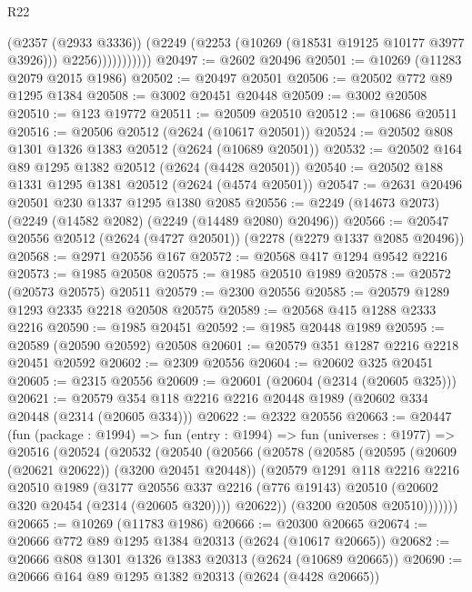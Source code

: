 \begin{lexlean}{R22}
\begin{coremodule}
                        (@2357 (@2933 @3336))
                        (@2249 (@2253 (@10269 (@18531 @19125 @10177 @3977 @3926))) @2256)))))))))))
@20497 := @2602 @20496
@20501 := @10269 (@11283 @2079 @2015 @1986)
@20502 := @20497 @20501
@20506 := @20502 @772 @89 @1295 @1384
@20508 := @3002 @20451 @20448
@20509 := @3002 @20508
@20510 := @123 @19772
@20511 := @20509 @20510
@20512 := @10686 @20511
@20516 := @20506 @20512 (@2624 (@10617 @20501))
@20524 := @20502 @808 @1301 @1326 @1383 @20512 (@2624 (@10689 @20501))
@20532 := @20502 @164 @89 @1295 @1382 @20512 (@2624 (@4428 @20501))
@20540 := @20502 @188 @1331 @1295 @1381 @20512 (@2624 (@4574 @20501))
@20547 := @2631 @20496 @20501 @230 @1337 @1295 @1380 @2085
@20556 := @2249 (@14673 @2073) (@2249 (@14582 @2082) (@2249 (@14489 @2080) @20496))
@20566 := @20547 @20556 @20512 (@2624 (@4727 @20501)) (@2278 (@2279 @1337 @2085 @20496))
@20568 := @2971 @20556 @167
@20572 := @20568 @417 @1294 @9542 @2216
@20573 := @1985 @20508
@20575 := @1985 @20510 @1989
@20578 := @20572 (@20573 @20575) @20511
@20579 := @2300 @20556
@20585 := @20579 @1289 @1293 @2335 @2218 @20508 @20575
@20589 := @20568 @415 @1288 @2333 @2216
@20590 := @1985 @20451
@20592 := @1985 @20448 @1989
@20595 := @20589 (@20590 @20592) @20508
@20601 := @20579 @351 @1287 @2216 @2218 @20451 @20592
@20602 := @2309 @20556
@20604 := @20602 @325 @20451
@20605 := @2315 @20556
@20609 := @20601 (@20604 (@2314 (@20605 @325)))
@20621 := @20579 @354 @118 @2216 @2216 @20448 @1989 (@20602 @334 @20448 (@2314 (@20605 @334)))
@20622 := @2322 @20556
@20663 := @20447
    (fun (package : @1994) =>
    fun (entry : @1994) =>
    fun (universes : @1977) =>
    @20516
      (@20524
        (@20532
          (@20540
            (@20566
              (@20578
                (@20585
                  (@20595 (@20609 (@20621 @20622)) (@3200 @20451 @20448))
                  (@20579
                    @1291
                    @118
                    @2216
                    @2216
                    @20510
                    @1989
                    (@3177
                      @20556
                      @337
                      @2216
                      (@776 @19143)
                      @20510
                      (@20602 @320 @20454 (@2314 (@20605 @320))))
                    @20622))
                (@3200 @20508 @20510)))))))
@20665 := @10269 (@11783 @1986)
@20666 := @20300 @20665
@20674 := @20666 @772 @89 @1295 @1384 @20313 (@2624 (@10617 @20665))
@20682 := @20666 @808 @1301 @1326 @1383 @20313 (@2624 (@10689 @20665))
@20690 := @20666 @164 @89 @1295 @1382 @20313 (@2624 (@4428 @20665))

\end{coremodule}
\end{lexlean}
